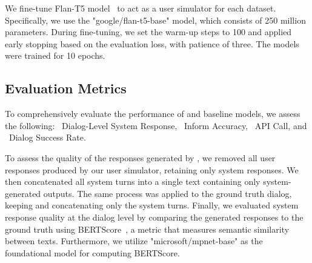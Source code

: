 We fine-tune Flan-T5 model~\cite{Chung2022}  to act as a user simulator for each dataset. Specifically, we use the "google/flan-t5-base" model, which consists of 250 million parameters.
During fine-tuning, we set the warm-up steps to 100 and applied early stopping based on the evaluation loss, with patience of three. The models were trained for 10 epochs.



\subsection{Evaluation Metrics}
To comprehensively evaluate the performance of {\ours} and baseline models, we assess the following: ~Dialog-Level System Response, ~Inform Accuracy, ~API Call, and ~Dialog Success Rate.


To assess the quality of the responses generated by {\ours}, we removed all user responses produced by our user simulator, retaining only system responses. We then concatenated all system turns into a single text containing only system-generated outputs. The same process was applied to the ground truth dialog, keeping and concatenating only the system turns. Finally, we evaluated system response quality at the dialog level by comparing the generated responses to the ground truth using BERTScore~\cite{zhang2019bertscore}, a metric that measures semantic similarity between texts. Furthermore, we utilize "microsoft/mpnet-base" as the foundational model for computing BERTScore.


